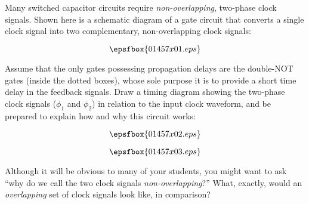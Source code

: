 

Many switched capacitor circuits require {\it non-overlapping}, two-phase clock signals.  Shown here is a schematic diagram of a gate circuit that converts a single clock signal into two complementary, non-overlapping clock signals:

$$\epsfbox{01457x01.eps}$$

Assume that the only gates possessing propagation delays are the double-NOT gates (inside the dotted boxes), whose sole purpose it is to provide a short time delay in the feedback signals.  Draw a timing diagram showing the two-phase clock signals ($\phi_1$ and $\phi_2$) in relation to the input clock waveform, and be prepared to explain how and why this circuit works:

$$\epsfbox{01457x02.eps}$$







$$\epsfbox{01457x03.eps}$$







Although it will be obvious to many of your students, you might want to ask ``why do we call the two clock signals {\it non-overlapping}?''  What, exactly, would an {\it overlapping} set of clock signals look like, in comparison?




